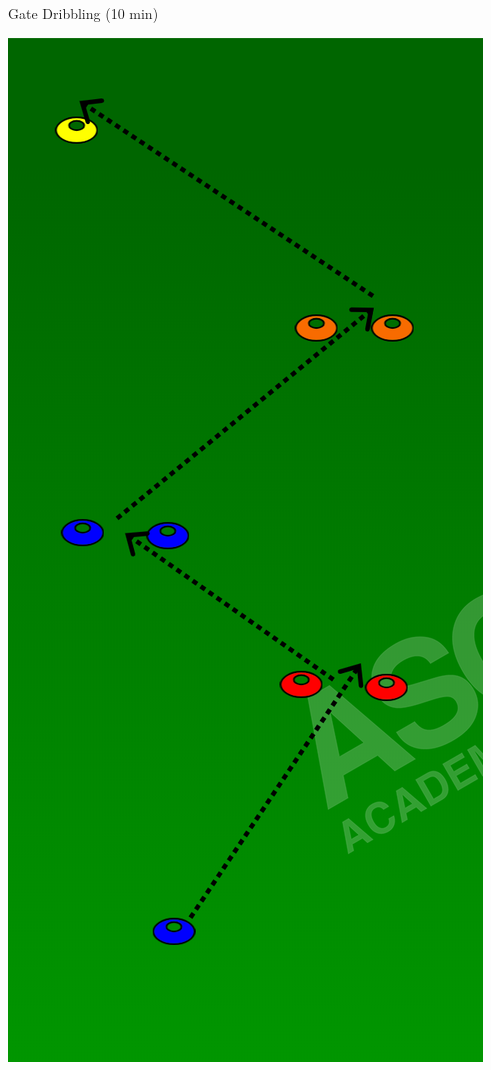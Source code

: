
\begin{oddBlock}{Gate Dribbling (10 min)}

\begin{minipage}[t]{\linewidth}
    \centering
    
    \begin{minipage}{.3\linewidth} %
            \includegraphics[width=.6\textwidth]{../img/Trimmed/Gate_Dribbling}

\end{minipage}
\end{minipage}
\end{oddBlock}
